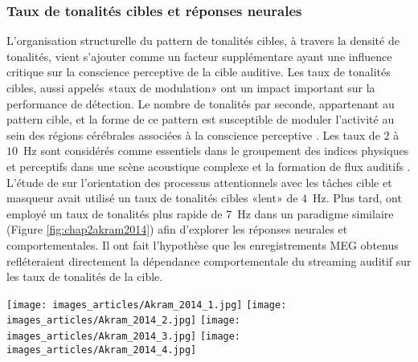 \subsubsection{Taux de tonalités cibles et réponses neurales}

L'organisation structurelle du pattern de tonalités cibles, à travers la densité de tonalités, vient s'ajouter comme un facteur supplémentare ayant une influence critique sur la conscience perceptive de la cible auditive. 
Les taux de tonalités cibles, aussi appelés «taux de modulation» ont un impact important sur la performance de détection. 
Le nombre de tonalités par seconde, appartenant au pattern cible, et la forme de ce pattern est susceptible de moduler l'activité au sein des régions cérébrales associées à la conscience perceptive \citep{eriksson2017activity}. 
Les taux de $2$ à $10$~Hz sont considérés comme essentiels dans le groupement des indices physiques et perceptifs dans une scène acoustique complexe et la formation de flux auditifs \citep{kowalski1996analysis, miller2002spectrotemporal, moore2002factors}. 
L'étude de \cite{elhilali2009interaction} sur l'orientation des processus attentionnels avec les tâches cible et masqueur avait utilisé un taux de tonalités cibles «lent» de $4$~Hz. 
Plus tard, \cite{akram2014investigating} ont employé un taux de tonalités plus rapide de $7$~Hz dans un paradigme similaire (Figure \ref{fig:chap2akram2014}) afin d'explorer les réponses neurales et comportementales. 
Il ont fait l'hypothèse que les enregistrements MEG obtenus refléteraient directement la dépendance comportementale du streaming auditif sur les taux de tonalités de la cible. 

\begin{figure*}[!t]
\center
\texttt{[image: images\_articles/Akram\_2014\_1.jpg]}
\texttt{[image: images\_articles/Akram\_2014\_2.jpg]}
\texttt{[image: images\_articles/Akram\_2014\_3.jpg]}
\texttt{[image: images\_articles/Akram\_2014\_4.jpg]}
\caption[Tâche d'attention en fonction de la variation des paramètres du stimulus sous MI]{(Haut Gauche) Illustration du type de stimuli employé par \cite{akram2014investigating}. Une séquence régulière de tonalités (en rouge) est placée dans un fond de tonalités (masqueurs, en jaune) distribués de façon aléatoire (en temps et en fréquence) et protégée par une région spectrale (région en vert). Dans la «tâche cible», les sujets devaient détecter une tonalité à fréquence décalée se produisant de manière aléatoire (flèche rouge). Dans la «tâche masqueur», les sujets devaient détecter une élongation de toutes les tonalités constitutives du masqueur dans une fenêtre de temps de $500$ ms (flèches bleues). (Haut Droite) Performance en fonction de la variation de la zone spectrale protégée. (Bas Gauche) Performance en fonction du taux de modulation pour une gamme étendue de $2$ à $10$~Hz, par pas de $2$~Hz. (Bas Droite) Performance en fonction du temps par taux de modulation. Adapté de \cite{akram2014investigating}.}
\label{fig:chap2akram2014}
\end{figure*}

